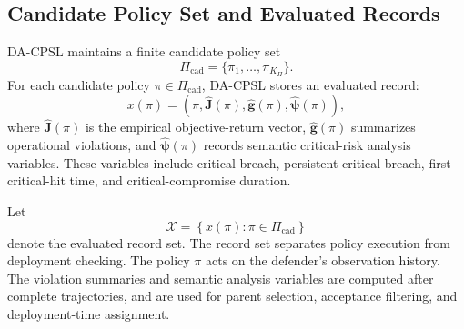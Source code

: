 \documentclass[sigconf,review,anonymous]{acmart}
\begin{document}
\subsection{Candidate Policy Set and Evaluated Records}
\label{subsec:dacpsl-overview}

DA-CPSL maintains a finite candidate policy set
\[
\Pi_{\mathrm{cad}}
=
\{\pi_1,\ldots,\pi_{K_\Pi}\}.
\]
For each candidate policy \(\pi\in\Pi_{\mathrm{cad}}\), DA-CPSL stores
an evaluated record:
\begin{equation}
x(\pi)
=
\left(
\pi,
\widehat{\mathbf{J}}(\pi),
\widehat{\mathbf{g}}(\pi),
\widehat{\boldsymbol{\psi}}(\pi)
\right),
\label{eq:dacpsl-record}
\end{equation}
where \(\widehat{\mathbf{J}}(\pi)\) is the empirical objective-return
vector, \(\widehat{\mathbf{g}}(\pi)\) summarizes operational violations,
and \(\widehat{\boldsymbol{\psi}}(\pi)\) records semantic critical-risk
analysis variables. These variables include critical breach, persistent
critical breach, first critical-hit time, and critical-compromise
duration.

Let
\begin{equation}
\mathcal{X}
=
\left\{
x(\pi):
\pi\in\Pi_{\mathrm{cad}}
\right\}
\label{eq:evaluated-record-set}
\end{equation}
denote the evaluated record set. The record set separates policy
execution from deployment checking. The policy \(\pi\) acts on the
defender's observation history. The violation summaries and semantic
analysis variables are computed after complete trajectories, and are used
for parent selection, acceptance filtering, and deployment-time
assignment. 
\end{document}
